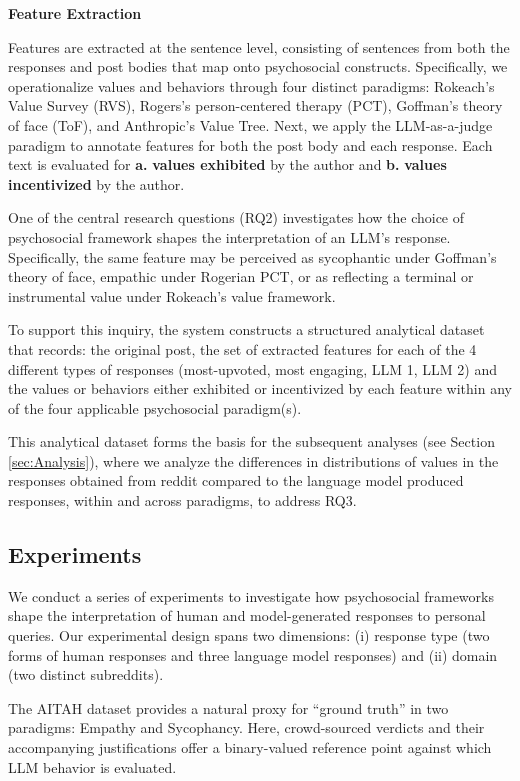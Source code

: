 \medskip 
\textbf{Feature Extraction}

\smallskip Features are extracted at the sentence level, consisting of sentences from both the responses and post bodies that map onto psychosocial constructs. Specifically, we operationalize values and behaviors through four distinct paradigms: Rokeach’s Value Survey (RVS), Rogers’s person-centered therapy (PCT), Goffman’s theory of face (ToF), and Anthropic’s Value Tree.
Next, we apply the LLM-as-a-judge paradigm \cite{zheng-et-al} to annotate features for both the post body and each response. Each text is evaluated for \textbf{a.} \textbf{values exhibited} by the author and \textbf{b.} \textbf{values incentivized} by the author. 


One of the central research questions (RQ2) investigates how the choice of psychosocial framework shapes the interpretation of an LLM’s response. Specifically, the same feature may be perceived as sycophantic under Goffman’s theory of face, empathic under Rogerian PCT, or as reflecting a terminal or instrumental value under Rokeach’s value framework.

To support this inquiry, the system constructs a structured analytical dataset that records: the original post, the set of extracted features for each of the 4 different types of responses (most-upvoted, most engaging, LLM 1, LLM 2) and the values or behaviors either exhibited or incentivized by each feature within any of the four applicable psychosocial paradigm(s).

This analytical dataset forms the basis for the subsequent analyses (see Section \ref{sec:Analysis}), where we analyze the differences in distributions of values in the responses obtained from reddit compared to the language model produced responses, within and across paradigms, to address RQ3.

\subsection{Experiments}
We conduct a series of experiments to investigate how psychosocial frameworks shape the interpretation of human and model-generated responses to personal queries. Our experimental design spans two dimensions: (i) response type (two forms of human responses and three language model responses) and (ii) domain (two distinct subreddits).

The AITAH dataset provides a natural proxy for “ground truth” in two paradigms: Empathy and Sycophancy. Here, crowd-sourced verdicts and their accompanying justifications offer a binary-valued reference point against which LLM behavior is evaluated.

